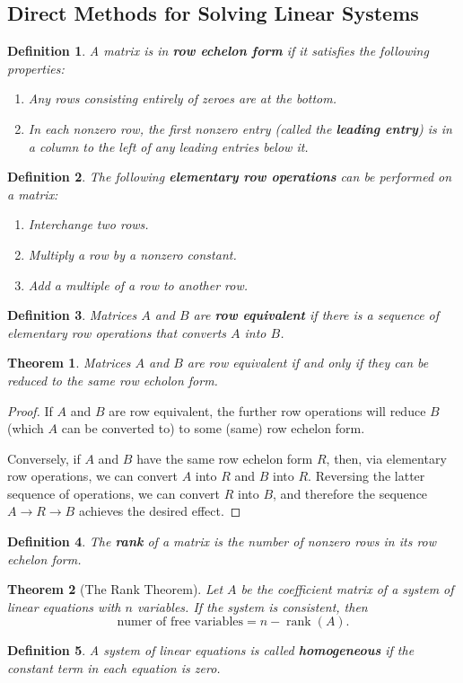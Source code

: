 \documentclass{article}
\newtheorem*{theorem*}{Theorem}
\newtheorem*{definition*}{Definition}
\begin{document}
\subsection{Direct Methods for Solving Linear Systems}
\begin{definition*}
  A matrix is in \textbf{row echelon form} if it satisfies the following properties:
  \begin{enumerate}
    \item Any rows consisting entirely of zeroes are at the bottom.
    \item In each nonzero row, the first nonzero entry (called the \textbf{leading entry}) is in a
      column to the left of any leading entries below it.
  \end{enumerate}
\end{definition*}
\begin{definition*}
  The following \textbf{elementary row operations} can be performed on a matrix:
  \begin{enumerate}
    \item Interchange two rows.
    \item Multiply a row by a nonzero constant.
    \item Add a multiple of a row to another row.
  \end{enumerate}
\end{definition*}
\begin{definition*}
  Matrices $A$ and $B$ are \textbf{row equivalent} if there is a sequence of elementary row
  operations that converts $A$ into $B$.
\end{definition*}
\begin{theorem*}
  Matrices $A$ and $B$ are row equivalent if and only if they can be reduced to the same row echolon
  form.
\end{theorem*}
\begin{proof}
  If $A$ and $B$ are row equivalent, the further row operations will reduce $B$ (which $A$ can be
  converted to) to some (same) row echelon form.

  Conversely, if $A$ and $B$ have the same row echelon form $R$, then, via elementary row
  operations, we can convert $A$ into $R$ and $B$ into $R$. Reversing the latter sequence of
  operations, we can convert $R$ into $B$, and therefore the sequence $A\to R\to B$ achieves the
  desired effect.
\end{proof}
\begin{definition*}
  The \textbf{rank} of a matrix is the number of nonzero rows in its row echelon form.
\end{definition*}
\begin{theorem*}[The Rank Theorem]
  Let $A$ be the coefficient matrix of a system of linear equations with $n$ variables. If the
  system is consistent, then
  \[\text{numer of free variables}=n-\operatorname{rank}(A).\]
\end{theorem*}
\begin{definition*}
  A system of linear equations is called \textbf{homogeneous} if the constant term in each equation
  is zero.
\end{definition*}
\end{document}
